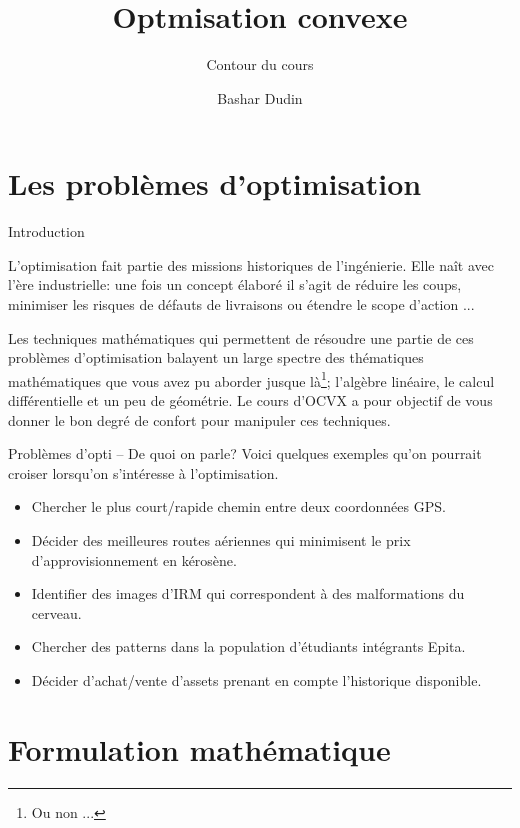 \documentclass[aspectratio = 169]{beamer}
\author[BD]{Bashar Dudin}
\institute[]{EPITA}
\title{Optmisation convexe} %
\subtitle{Contour du cours}
\begin{document}
\begin{frame}[plain]
\titlepage %
\end{frame}

\section{Les problèmes d'optimisation}

\begin{frame}{Introduction}

  L'optimisation fait partie des missions historiques de
  l'ingénierie. Elle naît avec l'ère industrielle: une fois un
  concept élaboré il s'agit de réduire les coups, minimiser les
  risques de défauts de livraisons ou étendre le scope d'action ...

  \pause Les techniques mathématiques qui permettent de résoudre une
  partie de ces problèmes d'optimisation balayent un large spectre des
  thématiques mathématiques que vous avez pu aborder jusque
  là\footnote{Ou non ...}; l'algèbre linéaire, le calcul
  différentielle et un peu de géométrie. Le cours d'OCVX a pour
  objectif de vous donner le bon degré de confort pour manipuler ces
  techniques.
\end{frame}

\begin{frame}{Problèmes d'opti -- De quoi on parle?}
  Voici quelques exemples qu'on pourrait croiser lorsqu'on s'intéresse
  à l'optimisation.
  \begin{itemize}
  \item<1-> Chercher le plus court/rapide chemin entre deux coordonnées
    GPS.
  \item<2-> Décider des meilleures routes aériennes qui minimisent le
    prix d'approvisionnement en kérosène.
  \item<3-> Identifier des images d'IRM qui correspondent à des
    malformations du cerveau.
  \item<4-> Chercher des patterns dans la population d'étudiants
    intégrants Epita.
  \item<5-> Décider d'achat/vente d'assets prenant en compte
    l'historique disponible.
  \end{itemize}
\end{frame}

\section{Formulation mathématique}
\end{document}
